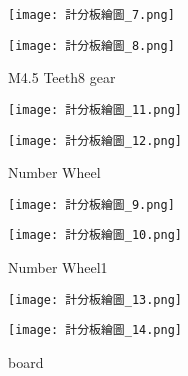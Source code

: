 {\begin{figure}[hbt!]
  \centering
  \texttt{[image: 計分板繪圖\_7.png]}
\end{figure}
\begin{figure}[hbt!]
  \centering
  \texttt{[image: 計分板繪圖\_8.png]}
  \caption{M4.5 Teeth8 gear}
  \label{fig:photo6}
\end{figure}

\begin{figure}[hbt!]
  \centering
  \texttt{[image: 計分板繪圖\_11.png]}
\end{figure}
\begin{figure}[hbt!]
  \centering
  \texttt{[image: 計分板繪圖\_12.png]}
  \caption{Number Wheel}
  \label{fig:photo7}
\end{figure}

\begin{figure}[hbt!]
  \centering
  \texttt{[image: 計分板繪圖\_9.png]}
\end{figure}
\begin{figure}[hbt!]
  \centering
  \texttt{[image: 計分板繪圖\_10.png]}
  \caption{Number Wheel1}
  \label{fig:photo8}
\end{figure}

\begin{figure}[hbt!]
  \centering
  \texttt{[image: 計分板繪圖\_13.png]}
\end{figure}
\begin{figure}[hbt!]
  \centering
  \texttt{[image: 計分板繪圖\_14.png]}
  \caption{board}
  \label{fig:photo9}
\end{figure}
}

